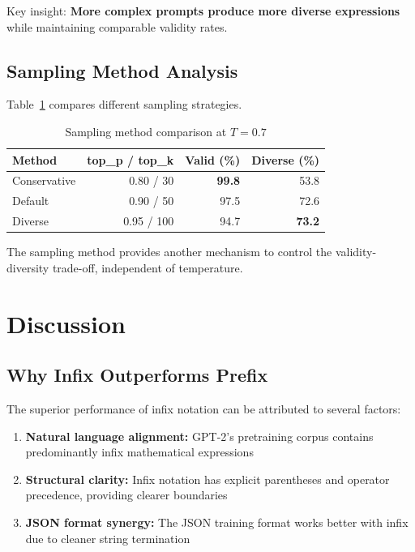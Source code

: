 \documentclass[11pt,a4paper]{article}
\begin{document}
Key insight: \textbf{More complex prompts produce more diverse expressions} while maintaining comparable validity rates.

\subsection{Sampling Method Analysis}

Table~\ref{tab:sampling} compares different sampling strategies.

\begin{table}[H]
\centering
\caption{Sampling method comparison at $T=0.7$}
\label{tab:sampling}
\begin{tabular}{lrrr}
\toprule
\textbf{Method} & \textbf{top\_p / top\_k} & \textbf{Valid (\%)} & \textbf{Diverse (\%)} \\
\midrule
Conservative & 0.80 / 30 & \textbf{99.8} & 53.8 \\
Default & 0.90 / 50 & 97.5 & 72.6 \\
Diverse & 0.95 / 100 & 94.7 & \textbf{73.2} \\
\bottomrule
\end{tabular}
\end{table}

The sampling method provides another mechanism to control the validity-diversity trade-off, independent of temperature.

\section{Discussion}

\subsection{Why Infix Outperforms Prefix}

The superior performance of infix notation can be attributed to several factors:

\begin{enumerate}
    \item \textbf{Natural language alignment:} GPT-2's pretraining corpus contains predominantly infix mathematical expressions
    \item \textbf{Structural clarity:} Infix notation has explicit parentheses and operator precedence, providing clearer boundaries
    \item \textbf{JSON format synergy:} The JSON training format works better with infix due to cleaner string termination
\end{enumerate}
\end{document}
